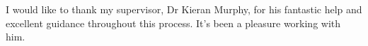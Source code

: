 I would like to thank my supervisor, Dr Kieran Murphy, for his fantastic help and excellent guidance throughout this process. It's been
a pleasure working with him.
